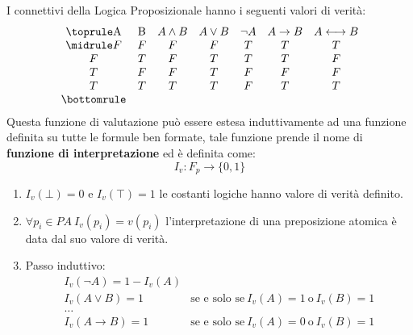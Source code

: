 I connettivi della Logica Proposizionale hanno i seguenti valori di verità:
\begin{equation}
    \begin{array}{ccccccc}
        \toprule
        \text{A} & \text{B} & A \land B & A \lor B & \neg A & A \to B & A \longleftrightarrow B \\
        \midrule
        F        & F        & F         & F        & T      & T       & T                       \\
        F        & T        & F         & T        & T      & T       & F                       \\
        T        & F        & F         & T        & F      & F       & F                       \\
        T        & T        & T         & T        & F      & T       & T                       \\
        \bottomrule
    \end{array}
\end{equation}
Questa funzione di valutazione può essere estesa induttivamente ad una funzione
definita su tutte le formule ben formate, tale funzione prende il nome di \textbf{funzione di interpretazione}
ed è definita come:
\begin{equation}
    I_v: F_p \to \{0, 1\}
\end{equation}
\begin{enumerate}
    \item $I_v (\bot) = 0$ e $I_v (\top) = 1$ le costanti logiche hanno valore
          di verità definito.
    \item $\forall p_i \in PA \ I_v(p_i) = v(p_i)$ l'interpretazione di una
          preposizione atomica è data dal suo valore di verità.
    \item Passo induttivo:
          \begin{equation}
              \begin{array}{cc}
                  I_v(\lnot A) = 1 - I_v(A) &                                                          \\
                  I_v(A \lor B) = 1         & \text{se e solo se} \ I_v(A) = 1 \ \text{o} \ I_v(B) = 1 \\
                  \dots                     &                                                          \\
                  I_v(A \to B) = 1          & \text{se e solo se} \ I_v(A) = 0 \ \text{o} \ I_v(B) = 1
              \end{array}
          \end{equation}
\end{enumerate}
